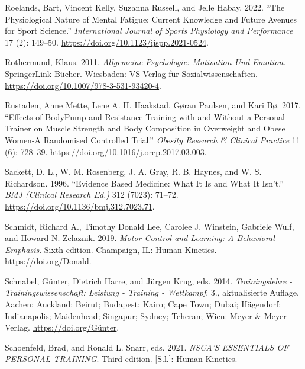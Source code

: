 \documentclass[
  letterpaper,
  DIV=11,
  numbers=noendperiod]{scrreprt}
\newlength{\cslhangindent}
\newenvironment{CSLReferences}[2] %
 {\begin{list}{}{%
  \setlength{\itemindent}{0pt}
  \setlength{\leftmargin}{0pt}
  \setlength{\parsep}{0pt}
  \ifodd #1
   \setlength{\leftmargin}{\cslhangindent}
   \setlength{\itemindent}{-1\cslhangindent}
  \fi
  \setlength{\itemsep}{#2\baselineskip}}}
 {\end{list}}
\begin{document}
\begin{CSLReferences}{1}{0}
Roelands, Bart, Vincent Kelly, Suzanna Russell, and Jelle Habay. 2022.
{``The {Physiological Nature} of {Mental Fatigue}: {Current Knowledge}
and {Future Avenues} for {Sport Science}.''} \emph{International Journal
of Sports Physiology and Performance} 17 (2): 149--50.
\url{https://doi.org/10.1123/ijspp.2021-0524}.

Rothermund, Klaus. 2011. \emph{Allgemeine {Psychologie}: {Motivation}
Und {Emotion}}. {SpringerLink B{ü}cher}. Wiesbaden: VS Verlag f{ü}r
Sozialwissenschaften. \url{https://doi.org/10.1007/978-3-531-93420-4}.

Rustaden, Anne Mette, Lene A. H. Haakstad, Gøran Paulsen, and Kari Bø.
2017. {``Effects of {BodyPump} and Resistance Training with and Without
a Personal Trainer on Muscle Strength and Body Composition in Overweight
and Obese Women-{A} Randomised Controlled Trial.''} \emph{Obesity
Research \& Clinical Practice} 11 (6): 728--39.
\url{https://doi.org/10.1016/j.orcp.2017.03.003}.

Sackett, D. L., W. M. Rosenberg, J. A. Gray, R. B. Haynes, and W. S.
Richardson. 1996. {``Evidence Based Medicine: What It Is and What It
Isn't.''} \emph{BMJ (Clinical Research Ed.)} 312 (7023): 71--72.
\url{https://doi.org/10.1136/bmj.312.7023.71}.

Schmidt, Richard A., Timothy Donald Lee, Carolee J. Winstein, Gabriele
Wulf, and Howard N. Zelaznik. 2019. \emph{Motor Control and Learning:
{A} Behavioral Emphasis}. Sixth edition. Champaign, IL: Human Kinetics.
\url{https://doi.org/Donald}.

Schnabel, Günter, Dietrich Harre, and Jürgen Krug, eds. 2014.
\emph{Trainingslehre - {Trainingswissenschaft}: {Leistung} - {Training}
- {Wettkampf}}. 3., aktualisierte Auflage. Aachen; Auckland; Beirut;
Budapest; Kairo; Cape Town; Dubai; H{ä}gendorf; Indianapolis;
Maidenhead; Singapur; Sydney; Teheran; Wien: Meyer \& Meyer Verlag.
\url{https://doi.org/Günter}.

Schoenfeld, Brad, and Ronald L. Snarr, eds. 2021. \emph{{NSCA}'{S
ESSENTIALS OF PERSONAL TRAINING}}. Third edition. {[}S.l.{]}: Human
Kinetics.


\end{CSLReferences}
\end{document}
